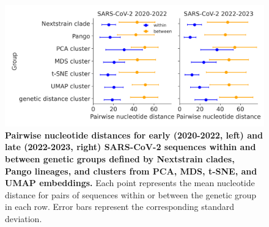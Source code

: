 \begin{figure}[!h]
\includegraphics[width=\columnwidth]{figures/within_between_sars.png}
\caption{{\bf Pairwise nucleotide distances for early (2020-2022, left) and late (2022-2023, right) SARS-CoV-2 sequences within and between genetic groups defined by Nextstrain clades, Pango lineages, and clusters from PCA, MDS, t-SNE, and UMAP embeddings.}
  Each point represents the mean nucleotide distance for pairs of sequences within or between the genetic group in each row.
  Error bars represent the corresponding standard deviation.}\label{S_Fig_sarscov2_within_between_group_distances}
\end{figure}

